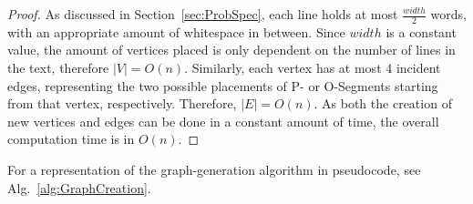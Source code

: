 \documentclass[11pt,a4paper]{vutinfth}
\begin{document}
\begin{proof}
	As discussed in Section~\ref{sec:ProbSpec}, each line holds at most $\frac{width}{2}$ words, with an appropriate amount of whitespace in between. Since $width$ is a constant value, the amount of vertices placed is only dependent on the number of lines in the text, therefore $|V|=O(n)$.
	Similarly, each vertex has at most 4 incident edges, representing the two possible placements of P- or O-Segments starting from that vertex, respectively. Therefore, $|E|=O(n)$. As both the creation of new vertices and edges can be done in a constant amount of time, the overall computation time is in $O(n)$.
\end{proof}

For a representation of the graph-generation algorithm in pseudocode, see Alg.~\ref{alg:GraphCreation}.
\end{document}
